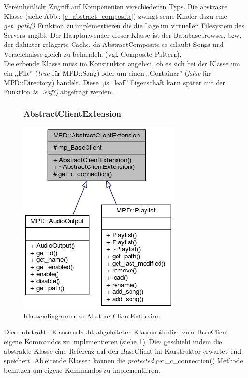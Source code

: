 Vereinheitlicht Zugriff auf Komponenten verschiedenen Typs.
Die abstrakte Klasse (siehe Abb.: \ref{c_abstract_composite}) zwingt seine Kinder dazu eine \emph{get\_path()} Funktion zu implementieren die die Lage im virtuellen Filesystem des Servers angibt.
Der Hauptanwender dieser Klasse ist der Databasebrowser, bzw. der dahinter gelagerte Cache, da AbstractComposite es erlaubt Songs und Verzeichnisse gleich zu behandeln (vgl. Composite Pattern).
\\
Die erbende Klasse muss im Konstruktor angeben, ob es sich bei der Klasse um ein ,,File'' (\emph{true} für MPD::Song) oder um einen ,,Container'' (\emph{false} für MPD::Directory) handelt.
Diese ,,is\_leaf'' Eigenschaft kann später mit der Funktion \emph{is\_leaf()} abgefragt werden.


\newpage
\begin{figure}[htb!]

\subsubsection{AbstractClientExtension}

	\centering
        \includegraphics[scale=0.8]{AbstractClientExtension.png}
	\caption{Klassendiagramm zu AbstractClientExtension}
	\label{c_abstract_client_extension}
\end{figure}


Diese abstrakte Klasse erlaubt abgeleiteten Klassen ähnlich zum BaseClient eigene Kommandos zu implementieren (siehe \ref{c_abstract_client_extension}).
Dies geschieht indem die abstrakte Klasse eine Referenz auf den BaseClient im Konstruktor erwartet und speichert.
Ableitende Klassen können die \textit{protected} get\_c\_connection() Methode benutzen um eigene Kommandos zu implementieren.

